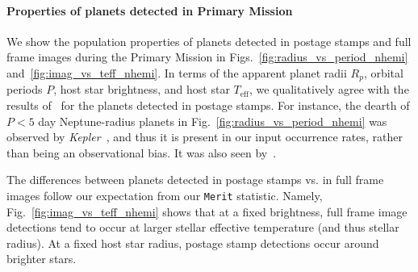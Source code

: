 \paragraph{Properties of planets detected in Primary Mission} 

We show the population properties of planets detected in postage
stamps and full frame images during the Primary Mission in
Figs.~\ref{fig:radius_vs_period_nhemi}
and~\ref{fig:imag_vs_teff_nhemi}.  In terms of the apparent planet
radii $R_p$, orbital periods $P$, host star brightness, and host star
$T_\mathrm{eff}$, we qualitatively agree with the results
of~ for the planets detected
in postage stamps. 
For instance, the dearth of $P<5$ day
Neptune-radius planets in Fig.~\ref{fig:radius_vs_period_nhemi} was
observed by \textit{Kepler}~\citep{mazeh_dearth_2016}, and thus it is
present in our input occurrence rates, rather than being an
observational bias.  It was also seen by~.

The differences between planets detected in postage stamps vs. in full frame images follow our expectation from our \texttt{Merit} statistic. 
Namely, Fig.~\ref{fig:imag_vs_teff_nhemi} shows that at a fixed brightness, full frame image detections tend to occur at larger stellar effective temperature (and thus stellar radius).
At a fixed host star radius, postage stamp detections occur around brighter stars.

